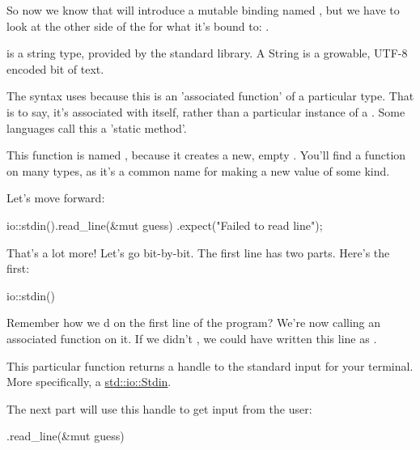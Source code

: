 \blank

So now we know that  will introduce a mutable binding named , but we have to look at the 
other side of the \code{=} for what it's bound to: .

\blank

 is a string type, provided by the standard library. A String is a growable, UTF-8 encoded bit of text.

\blank

The  syntax uses \code{::} because this is an 'associated function' of a particular type. That is to say, it's
associated with  itself, rather than a particular instance of a . Some languages call this a 
'static method'.

\blank

This function is named , because it creates a new, empty . You'll find a  function on 
many types, as it's a common name for making a new value of some kind.

\blank

Let's move forward:

\begin{rustc}
    io::stdin().read_line(&mut guess)
        .expect("Failed to read line");

\end{rustc}

That's a lot more! Let's go bit-by-bit. The first line has two parts. Here's the first:

\begin{rustc}
io::stdin()
\end{rustc}

Remember how we d  on the first line of the program? We're now calling an associated 
function on it. If we didn't , we could have written this line as .

\blank

This particular function returns a handle to the standard input for your terminal. More specifically, a 
\href{https://doc.rust-lang.org/std/io/struct.Stdin.html}{std::io::Stdin}.

\blank

The next part will use this handle to get input from the user:

\begin{rustc}
.read_line(&mut guess)
\end{rustc}

